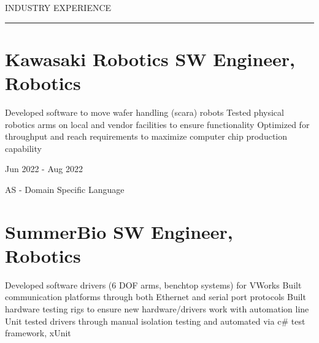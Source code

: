 
\vspace{3ex}
{\noindent\color{cblue} INDUSTRY EXPERIENCE }

\vspace{-6.5ex}
{\hspace{-1.73in}\noindent\color{dblue}\rule{6.935in}{0.4pt}} %
\vspace{-3.4ex}


\section
{\textbf{Kawasaki Robotics} \newline
SW Engineer, Robotics}{}

\vspace{-2.0ex}
\begin{detail}
    \BulletItem
    Developed software to move wafer handling (scara) robots 
    \BulletItem
    Tested physical robotics arms on local and vendor facilities to ensure functionality
    \BulletItem
    Optimized for throughput and reach requirements to maximize computer chip production capability
\end{detail}

\begin{subtitle}
    \vspace{-10.5ex}
    {{Jun 2022 - Aug 2022}}
\end{subtitle}

{\vspace{3ex} \color{cyan}\small {AS - Domain Specific Language}}
\vspace{1ex}


\section
{\textbf{SummerBio} \newline
SW Engineer, Robotics}{}

\vspace{-2.5ex}
\begin{detail}
    \BulletItem
    Developed software drivers (6 DOF arms, benchtop systems) for VWorks
    \BulletItem
    Built communication platforms through both Ethernet and serial port protocols
    \BulletItem
    Built hardware testing rigs to ensure new hardware/drivers work with automation line
    \BulletItem
    Unit tested drivers through manual isolation testing and automated via c\# test framework, xUnit
\end{detail}

